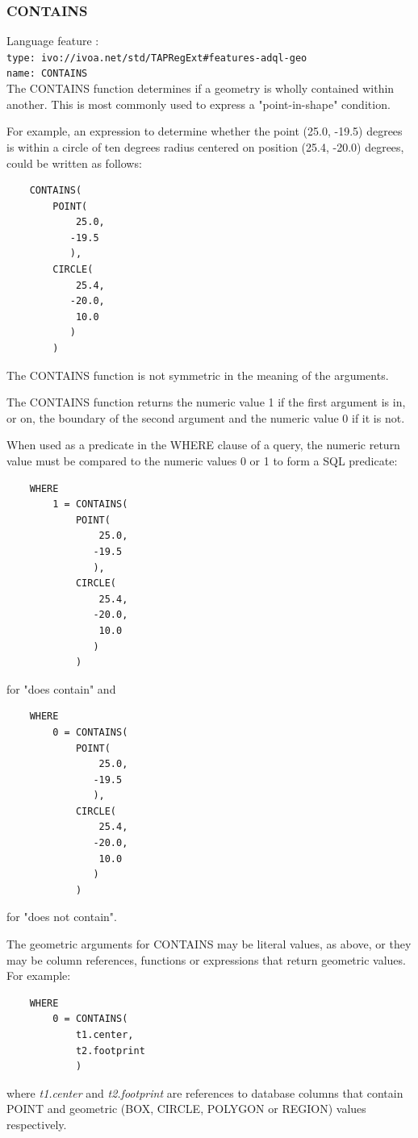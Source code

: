 \documentclass[11pt,a4paper]{ivoa}
\begin{document}
\subsubsection{CONTAINS}
\label{sec:functions.geom.contains}
{\footnotesize Language feature :}\\
{\footnotesize \verb|type: ivo://ivoa.net/std/TAPRegExt#features-adql-geo|}\\
{\footnotesize \verb|name: CONTAINS|}\\

The CONTAINS function determines if a geometry is wholly contained within
another. This is most commonly used to express a "point-in-shape" condition.

For example, an expression to determine whether the point (25.0, -19.5) degrees
is within a circle of ten degrees radius centered on position (25.4, -20.0) degrees,
could be written as follows:
\begin{verbatim}
    CONTAINS(
        POINT(
            25.0,
           -19.5
           ),
        CIRCLE(
            25.4,
           -20.0,
            10.0
           )
        )
\end{verbatim}

The CONTAINS function is not symmetric in the meaning of the arguments.

The CONTAINS function returns the numeric value 1 if the first argument
is in, or on, the boundary of the second argument and the numeric value 0
if it is not.

When used as a predicate in the WHERE clause of a query, the numeric return
value must be compared to the numeric values 0 or 1 to form a SQL predicate:
\begin{verbatim}
    WHERE
        1 = CONTAINS(
            POINT(
                25.0,
               -19.5
               ),
            CIRCLE(
                25.4,
               -20.0,
                10.0
               )
            )
\end{verbatim}
\noindent
for "does contain" and
\begin{verbatim}
    WHERE
        0 = CONTAINS(
            POINT(
                25.0,
               -19.5
               ),
            CIRCLE(
                25.4,
               -20.0,
                10.0
               )
            )
\end{verbatim}
\noindent
for "does not contain".


The geometric arguments for CONTAINS may be literal values, as above,
or they may be column references, functions or expressions that return
geometric values.
For example:
\begin{verbatim}
    WHERE
        0 = CONTAINS(
            t1.center,
            t2.footprint
            )
\end{verbatim}
where \textit{t1.center} and \textit{t2.footprint} are references to
database columns that contain POINT and geometric (BOX, CIRCLE, POLYGON or REGION)
values respectively.
\end{document}
